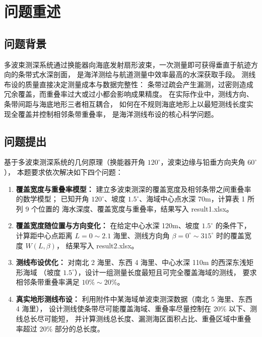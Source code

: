 \documentclass[withoutpreface,bwprint]{cumcmthesis} %
\begin{document}
\section{问题重述}

\subsection{问题背景}

多波束测深系统通过换能器向海底发射扇形波束，一次测量即可获得垂直于航迹方向的条带式水深剖面，
是海洋测绘与航道测量中效率最高的水深获取手段\cite{bib:lidong,bib:zhao}。
测线布设的质量直接决定测量成本与数据完整性：
条带过疏会产生漏测，过密则造成冗余覆盖，而重叠率过大或过小都会影响成果精度\cite{bib:gb}。
在实际作业中，测线方向、条带间距与海底地形三者相互耦合，
如何在不规则海底地形上以最短测线长度实现全覆盖并控制相邻条带重叠率，
是海洋测线布设的核心科学问题。

\subsection{问题提出}

基于多波束测深系统的几何原理（换能器开角 $120^\circ$，波束边缘与铅垂方向夹角 $60^\circ$），
本题要求依次解决如下四个问题：
\begin{enumerate}

    \item \textbf{覆盖宽度与重叠率模型：} 建立多波束测深的覆盖宽度及相邻条带之间重叠率的数学模型；
    已知开角 $120^\circ$、坡度 $1.5^\circ$、海域中心点水深 70m，计算表 1 所列 9 个位置的
    海水深度、覆盖宽度与重叠率，结果写入 result1.xlsx。

    \item \textbf{覆盖宽度随位置与方向变化：} 在给定中心水深 120m、坡度 $1.5^\circ$ 的条件下，
    计算距中心点距离 $L=0\sim2.1$ 海里、测线方向角 $\beta=0^\circ\sim315^\circ$ 时的覆盖宽度 $W(L,\beta)$，
    结果写入 result2.xlsx。

    \item \textbf{测线布设优化：} 对南北 2 海里、东西 4 海里、中心水深 110m 的西深东浅矩形海域
    （坡度 $1.5^\circ$），设计一组测量长度最短且可完全覆盖海域的测线，
    要求相邻条带重叠率满足 $10\%\sim20\%$。

    \item \textbf{真实地形测线布设：} 利用附件中某海域单波束测深数据（南北 5 海里、东西 4 海里），
    设计测线使条带尽可能覆盖海域、重叠率尽量控制在 20\% 以下、测线总长尽可能短，
    并计算测线总长度、漏测海区面积占比、重叠区域中重叠率超过 20\% 部分的总长度。

\end{enumerate}
\end{document}

